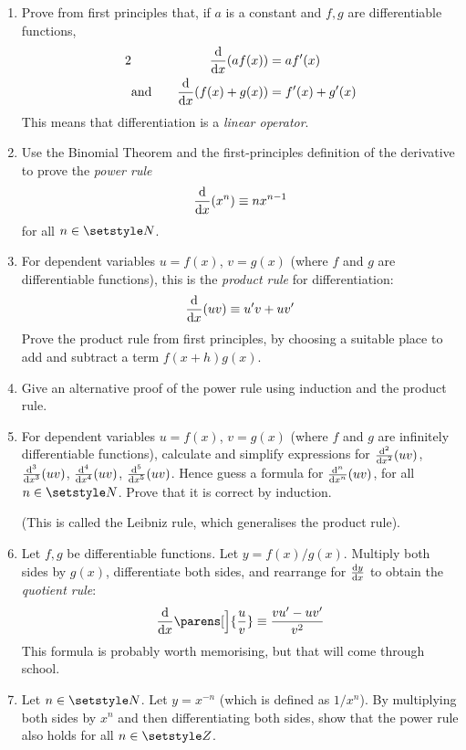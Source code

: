 \begin{enumerate}
 \item
  Prove from first principles that, if
  \(a\) is a constant and \(f, g\) are differentiable functions,
  \begin{alignat*}2
   && \dv{x}(af(x)) &= af'(x) \\
   &\text{and}\quad&\dv{x}(f(x) + g(x)) &= f'(x) + g'(x)
  \end{alignat*}
  This means that differentiation is a \emph{linear operator}.
 \item
  Use the Binomial Theorem and the first-principles definition of the derivative
  to prove the \emph{power rule}
  \begin{equation*}
   \dv{x}(x^n) \equiv nx^{n - 1}
  \end{equation*}
  for all \(n \in \Naturals\).
 \item
  For dependent variables \(u = f(x)\), \(v = g(x)\) (where \(f\) and \(g\) are
  differentiable functions), this is the
  \emph{product rule} for differentiation:
  \begin{equation*}
   \dv{x}(uv) \equiv u'v + uv'
  \end{equation*}
  Prove the product rule from first principles, by choosing a suitable place to
  add and subtract a term \(f(x + h)g(x)\).
 \item
  Give an alternative proof of the power rule using induction and the product
  rule.
 \item
  For dependent variables \(u = f(x)\), \(v = g(x)\) (where \(f\) and \(g\) are
  infinitely differentiable functions), calculate and simplify expressions for
  \(\dv[2]{x}(uv)\), \(\dv[3]{x}(uv)\), \(\dv[4]{x}(uv)\), \(\dv[5]{x}(uv)\).
  Hence guess a formula for \(\dv[n]{x}(uv)\), for all \(n \in \Naturals\).
  Prove that it is correct by induction.

  (This is called the Leibniz rule, which generalises the product rule).
 \item
  Let \(f, g\) be differentiable functions. Let \(y = f(x) / g(x)\). Multiply
  both sides by \(g(x)\), differentiate both sides, and rearrange for
  \(\dv<y>{x}\) to obtain the \emph{quotient rule}:
  \begin{equation*}
   \dv{x}\parens[\Big]{\frac uv}
    \equiv \frac{vu' - uv'}{v^2}
  \end{equation*}
  This formula is probably worth memorising, but that will come through school.
 \item
  Let \(n \in \Naturals\). Let \(y = x^{-n}\) (which is defined as \(1 / x^n\)).
  By multiplying both sides by \(x^n\) and then differentiating both sides, show
  that the power rule also holds for all \(n \in \Integers\).


\end{enumerate}
